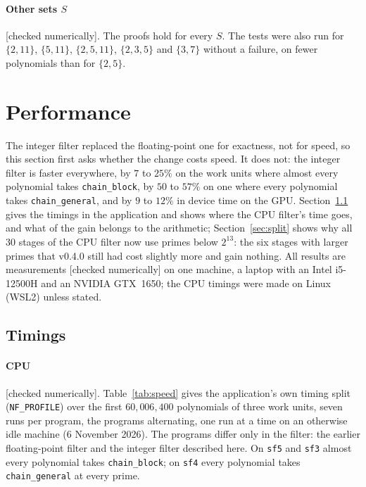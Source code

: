 \documentclass[10pt,a4paper]{article}
\newcommand{\code}[1]{\texttt{#1}}
\newcommand{\stnum}{\textsf{\small[checked numerically]}\xspace}
\theoremstyle{plain}
\theoremstyle{definition}
\begin{document}
\paragraph{Other sets $S$} \stnum.  The proofs hold for every $S$.  The tests were also run for $\{2,11\}$, $\{5,11\}$, $\{2,5,11\}$, $\{2,3,5\}$ and $\{3,7\}$ without a
failure, on fewer polynomials than for $\{2,5\}$.

\section{Performance}\label{sec:speed}

The integer filter replaced the floating-point one for exactness, not for speed, so this section first asks whether the change costs speed.  It does not: the
integer filter is faster everywhere, by $7$ to $25\%$ on the work units where almost every polynomial takes \code{chain\_block}, by $50$ to $57\%$ on one where every
polynomial takes \code{chain\_general}, and by $9$ to $12\%$ in device time on the GPU.  Section~\ref{sec:timings} gives the timings in the application and shows where the CPU
filter's time goes, and what of the gain belongs to the arithmetic; Section~\ref{sec:split} shows why all $30$ stages of the CPU filter now use primes below
$2^{13}$: the six stages with larger primes that v0.4.0 still had cost slightly more and gain nothing.  All results are measurements \stnum on one machine, a laptop with an Intel i5-12500H and an NVIDIA GTX~1650; the CPU timings
were made on Linux (WSL2) unless stated.

\subsection{Timings}\label{sec:timings}

\paragraph{CPU} \stnum.  Table~\ref{tab:speed} gives the application's own timing split (\code{NF\_PROFILE}) over the first $60{,}006{,}400$ polynomials of three
work units, seven runs per program, the programs alternating, one run at a time on an otherwise idle machine (6 November 2026).  The programs differ only in the
filter: the earlier floating-point filter and the integer filter described here.  On \code{sf5} and \code{sf3} almost every polynomial takes \code{chain\_block}; on
\code{sf4} every polynomial takes \code{chain\_general} at every prime.
\end{document}

